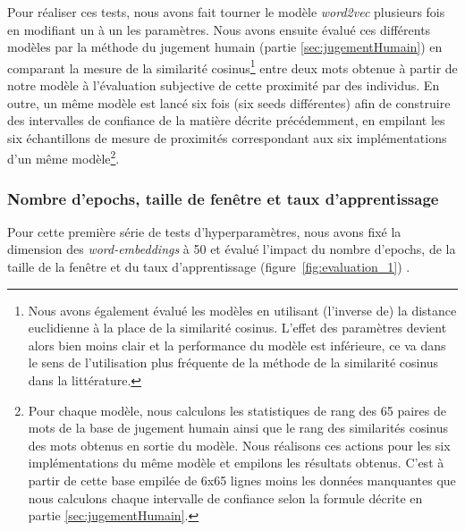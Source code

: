 \documentclass[11pt,french,french]{article}
\let\rmarkdownfootnote\footnote%
\def\footnote{\protect\rmarkdownfootnote}
\begin{document}
Pour réaliser ces tests, nous avons fait tourner le modèle
\emph{word2vec} plusieurs fois en modifiant un à un les paramètres. Nous
avons ensuite évalué ces différents modèles par la méthode du
\og jugement humain \fg{} (partie \ref{sec:jugementHumain}) en comparant
la mesure de la similarité cosinus\footnote{Nous avons également évalué
  les modèles en utilisant (l'inverse de) la distance euclidienne à la
  place de la similarité cosinus. L'effet des paramètres devient alors
  bien moins clair et la performance du modèle est inférieure, ce va
  dans le sens de l'utilisation plus fréquente de la méthode de la
  similarité cosinus dans la littérature.} entre deux mots obtenue à
partir de notre modèle à l'évaluation subjective de cette proximité par
des individus. En outre, un même modèle est lancé six fois (six
\og seeds \fg{} différentes) afin de construire des intervalles de
confiance de la matière décrite précédemment, en empilant les six
échantillons de mesure de proximités correspondant aux six
implémentations d'un même modèle\footnote{Pour chaque modèle, nous
  calculons les statistiques de rang des 65 paires de mots de la base de
  jugement humain ainsi que le rang des similarités cosinus des mots
  obtenus en sortie du modèle. Nous réalisons ces actions pour les six
  implémentations du même modèle et empilons les résultats obtenus.
  C'est à partir de cette base empilée de 6x65 lignes moins les données
  manquantes que nous calculons chaque intervalle de confiance selon la
  formule décrite en partie \ref{sec:jugementHumain}.}.

\subsubsection{Nombre d'epochs, taille de fenêtre et taux
d'apprentissage}\label{nombre-depochs-taille-de-fenuxeatre-et-taux-dapprentissage}

Pour cette première série de tests d'hyperparamètres, nous avons fixé la
dimension des \emph{word-embeddings} à 50 et évalué l'impact du nombre
d'epochs, de la taille de la fenêtre et du taux d'apprentissage
(figure~\ref{fig:evaluation_1}) .
\end{document}
